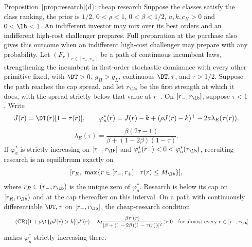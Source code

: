 \begin{named}{Proposition~\ref{prop:research}(d): cheap research}
Suppose the classes satisfy the class ranking, the prior is \(1/2\), \(0<\rho<1\), \(0<\beta<1/2\),
\(a,k,c_H>0\) and \(0<\lb<1\). An indifferent investor may mix over its best orders and an indifferent high-cost
challenger prepares. Full preparation at the purchase also gives this outcome when an indifferent high-cost
challenger may prepare with any probability.
Let \((F_r)_{r\in[r_-,r_+]}\) be a path of continuous incumbent laws, strengthening the incumbent in first-order
stochastic dominance with every other primitive fixed, with \(\DT>0\), \(g_H>g_L\), continuous
\(\DT,\tau\), and \(\tau>1/2\). Suppose the path reaches the cap spread, and let
\(r_{\lb}\) be the first strength at which it does, with the spread strictly below that value at \(r_-\).
On \([r_-,r_{\lb}]\), suppose \(\tau<1\). Write
\[
 J(r)=\DT(r)[1-\tau(r)],\qquad
 \varphi_a^*(r)=J(r)-k+(\rho J(r)-k)^+-2a\lambda_E(\tau(r)),
\]
\[
 \lambda_E(\tau)=\frac{\beta(2\tau-1)}{\beta+(1-2\beta)(1-\tau)}.
\]
If \(\varphi_a^*\) is strictly increasing on \([r_-,r_{\lb}]\) and
\(\varphi_a^*(r_-)<0<\varphi_a^*(r_{\lb})\), recruiting research is an equilibrium
exactly on
\[
 [r_R,\ \max\{r\in[r_-,r_+]:\tau(r)\le M_{\lb}\}],
\]
where \(r_R\in(r_-,r_{\lb})\) is the unique zero of \(\varphi_a^*\).
Research is below its cap on \([r_R,r_{\lb})\) and at the cap thereafter on this interval.
On a path with continuously differentiable \(\DT,\tau\) on \([r_-,r_{\lb}]\), the cheap-research condition
\begin{equation}\tag{CR}\label{eq:a5-cheap}
 [1+\rho\1\{\rho J(r)>k\}]J'(r)
 -2a\frac{\beta\tau'(r)}{[\beta+(1-2\beta)(1-\tau(r))]^2}>0
 \quad\text{for almost every }r\in[r_-,r_{\lb}]
\end{equation}
makes \(\varphi_a^*\) strictly increasing there.
\end{named}


